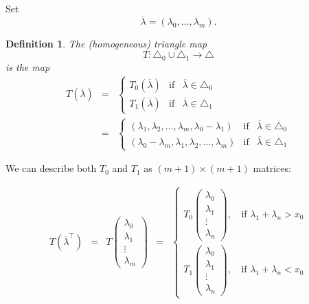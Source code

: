 \documentclass[12pt,oneside,openany]{article}
\newtheorem{definition}[theorem]{Definition}
\begin{document}
Set
$$ \overline{\lambda}=  (\lambda_0, \ldots, \lambda_m).$$

\begin{definition} The (homogeneous) triangle map 
$$T:\triangle_0 \cup \triangle_1 \rightarrow \triangle$$
is  the map
\begin{eqnarray*}
T(\overline{\lambda}) &=& \left\{ \begin{array}{ccc}   T_0(  \overline{\lambda}) & \mbox{if} &  \overline{\lambda}\in \triangle_0 \\
T_1(  \overline{\lambda}) & \mbox{if} &  \overline{\lambda}\in \triangle_1\end{array}   \right.\\
&=& \left\{ \begin{array}{ccc} (\lambda_1, \lambda_2, \ldots, \lambda_m, \lambda_0-\lambda_1)& \mbox{if} &  \overline{\lambda}\in \triangle_0 \\
(\lambda_0-\lambda_m, \lambda_1, \lambda_2, \ldots, \lambda_m) & \mbox{if} &  \overline{\lambda}\in \triangle_1\end{array}   \right.
\end{eqnarray*}
\end{definition}

We can describe both $T_0$ and $T_1$ as $(m+1) \times (m+1)$ matrices:


$$\begin{array}{ccccc}
T\left(\overline{\lambda}^{\top}\right) &=&  T\left( \begin{array}{c} \lambda_0 \\ \lambda_1 \\ \vdots  \\ \lambda_m  \end{array}  \right)&=&  \left\{ \begin{array}{ccc} T_0 \left( \begin{array}{c} \lambda_0 \\ \lambda_1 \\ \vdots  \\ \lambda_n  \end{array}  \right),&\, \text{if }  \lambda_1+\lambda_n>x_0 \\
                                                       T_1  \left( \begin{array}{c} \lambda_0 \\ \lambda_1 \\ \vdots  \\ \lambda_n  \end{array}  \right),&\, \text{if } \lambda_1+\lambda_n<x_0 \end{array} \right.  \\
                                                         \end{array}$$
  
\end{document}
